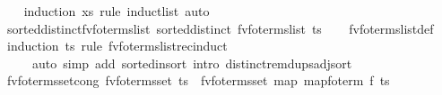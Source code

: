 \begin{isabellebody}
%
\isadelimproof
\ \ %
\endisadelimproof
%
\isatagproof
{}\isamarkupfalse%
\ {\isacharparenleft}{\kern0pt}induction\ xs\ rule{\isacharcolon}{\kern0pt}\ induct{\isacharunderscore}{\kern0pt}list{}{}{}{\isacharparenright}{\kern0pt}\ auto%
\endisatagproof
{\isafoldproof}%
%
\isadelimproof
\isanewline
%
\endisadelimproof
\isanewline
{}\isamarkupfalse%
\ sorted{\isacharunderscore}{\kern0pt}distinct{\isacharunderscore}{\kern0pt}fv{\isacharunderscore}{\kern0pt}fo{\isacharunderscore}{\kern0pt}terms{\isacharunderscore}{\kern0pt}list{\isacharcolon}{\kern0pt}\ {\isachardoublequoteopen}sorted{\isacharunderscore}{\kern0pt}distinct\ {\isacharparenleft}{\kern0pt}fv{\isacharunderscore}{\kern0pt}fo{\isacharunderscore}{\kern0pt}terms{\isacharunderscore}{\kern0pt}list\ ts{\isacharparenright}{\kern0pt}{\isachardoublequoteclose}\isanewline
%
\isadelimproof
\ \ %
\endisadelimproof
%
\isatagproof
{}\isamarkupfalse%
\ fv{\isacharunderscore}{\kern0pt}fo{\isacharunderscore}{\kern0pt}terms{\isacharunderscore}{\kern0pt}list{\isacharunderscore}{\kern0pt}def\isanewline
\ \ \isamarkupfalse%
\ {\isacharparenleft}{\kern0pt}induction\ ts\ rule{\isacharcolon}{\kern0pt}\ fv{\isacharunderscore}{\kern0pt}fo{\isacharunderscore}{\kern0pt}terms{\isacharunderscore}{\kern0pt}list{\isacharunderscore}{\kern0pt}rec{\isachardot}{\kern0pt}induct{\isacharparenright}{\kern0pt}\isanewline
\ \ \ \ \ {\isacharparenleft}{\kern0pt}auto\ simp\ add{\isacharcolon}{\kern0pt}\ sorted{\isacharunderscore}{\kern0pt}insort\ intro{\isacharcolon}{\kern0pt}\ distinct{\isacharunderscore}{\kern0pt}remdups{\isacharunderscore}{\kern0pt}adj{\isacharunderscore}{\kern0pt}sort{\isacharparenright}{\kern0pt}%
\endisatagproof
{\isafoldproof}%
%
\isadelimproof
\isanewline
%
\endisadelimproof
\isanewline
{}\isamarkupfalse%
\ fv{\isacharunderscore}{\kern0pt}fo{\isacharunderscore}{\kern0pt}terms{\isacharunderscore}{\kern0pt}set{\isacharunderscore}{\kern0pt}cong{\isacharcolon}{\kern0pt}\ {\isachardoublequoteopen}fv{\isacharunderscore}{\kern0pt}fo{\isacharunderscore}{\kern0pt}terms{\isacharunderscore}{\kern0pt}set\ ts\ {\isacharequal}{\kern0pt}\ fv{\isacharunderscore}{\kern0pt}fo{\isacharunderscore}{\kern0pt}terms{\isacharunderscore}{\kern0pt}set\ {\isacharparenleft}{\kern0pt}map\ {\isacharparenleft}{\kern0pt}map{\isacharunderscore}{\kern0pt}fo{\isacharunderscore}{\kern0pt}term\ f{\isacharparenright}{\kern0pt}\ ts{\isacharparenright}{\kern0pt}{\isachardoublequoteclose}\isanewline
%
\isadelimproof
\ \ %
\endisadelimproof
%
\isatagproof

\end{isabellebody}
